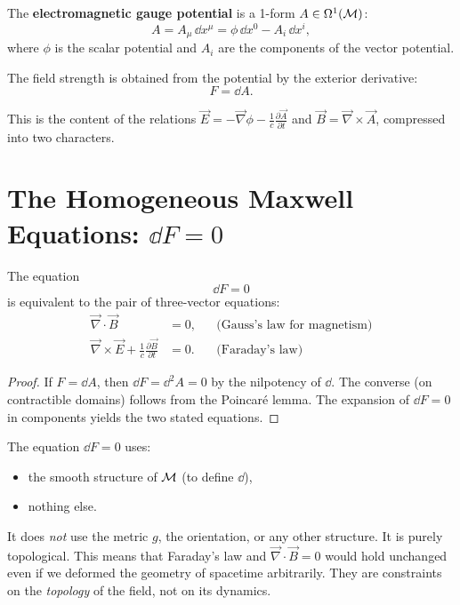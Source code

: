 \begin{definition}
The \textbf{electromagnetic gauge potential} is a 1-form $A \in \Omega^1(\mathcal{M})$:
\begin{equation}
A = A_\mu\,\dd x^\mu = \phi\,\dd x^0 - A_i\,\dd x^i,
\end{equation}
where $\phi$ is the scalar potential and $A_i$ are the components of the vector potential.
\end{definition}

The field strength is obtained from the potential by the exterior derivative:
\begin{equation}
\boxed{F = \dd A.}
\end{equation}

This is the content of the relations $\vec{E} = -\vec{\nabla}\phi - \frac{1}{c}\frac{\partial\vec{A}}{\partial t}$ and $\vec{B} = \vec{\nabla}\times\vec{A}$, compressed into two characters.

\section{The Homogeneous Maxwell Equations: $\dd F = 0$}

\begin{theorem}
The equation
\begin{equation}
\boxed{\dd F = 0}
\end{equation}
is equivalent to the pair of three-vector equations:
\begin{align}
\vec{\nabla}\cdot\vec{B} &= 0, & &\text{(Gauss's law for magnetism)} \\
\vec{\nabla}\times\vec{E} + \frac{1}{c}\frac{\partial\vec{B}}{\partial t} &= 0. & &\text{(Faraday's law)}
\end{align}
\end{theorem}

\begin{proof}
If $F = \dd A$, then $\dd F = \dd^2 A = 0$ by the nilpotency of $\dd$. The converse (on contractible domains) follows from the Poincar\'e lemma. The expansion of $\dd F = 0$ in components yields the two stated equations.
\end{proof}

\begin{remark}
The equation $\dd F = 0$ uses:
\begin{itemize}
\item the smooth structure of $\mathcal{M}$ (to define $\dd$),
\item nothing else.
\end{itemize}
It does \emph{not} use the metric $g$, the orientation, or any other structure. It is purely topological. This means that Faraday's law and $\vec{\nabla}\cdot\vec{B} = 0$ would hold unchanged even if we deformed the geometry of spacetime arbitrarily. They are constraints on the \emph{topology} of the field, not on its dynamics.
\end{remark}

